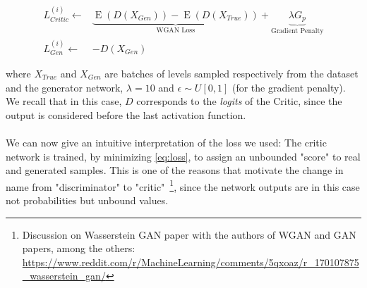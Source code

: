 \begin{equation}
\label{eq:loss}
\begin{split}
L_{Critic}^{(i)} \gets & \underbrace{\operatorname{E}(D(X_{Gen})) - \operatorname{E}(D(X_{True}))}_{\text{WGAN Loss}} + \underbrace {\lambda G_p}_{\text{Gradient Penalty}} \\
L_{Gen}^{(i)} \gets & -D(X_{Gen}) 
\end{split}
\end{equation}

where $X_{True}$ and $X_{Gen}$ are batches of levels sampled respectively from the dataset and the generator network, $\lambda = 10$ and $ \epsilon \sim U[0,1] $ (for the gradient penalty). We recall that in this case, $D$ corresponds to the \textit{logits} of the Critic, since the output is considered before the last activation function.

\paragraph{} We can now give an intuitive interpretation of the loss we used: The critic network is trained, by minimizing \ref{eq:loss}, to assign an unbounded "score" to real and generated samples. This is one of the reasons that motivate the change in name from "discriminator" to "critic"~\footnote{ Discussion on Wasserstein GAN paper with the authors of WGAN and GAN papers, among the others: \url{https://www.reddit.com/r/MachineLearning/comments/5qxoaz/r_170107875_wasserstein_gan/}}, since the network outputs are in this case not probabilities but unbound values.

